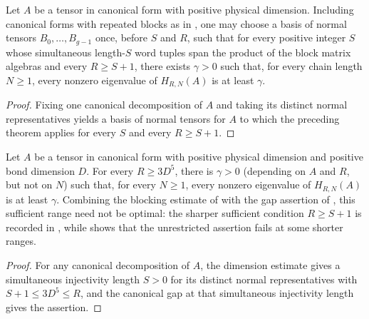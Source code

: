 \begin{lemma}
    \label{thm:canonical-gap-simultaneous-injectivity}
    \leanok
    Let $A$ be a tensor in canonical form with positive physical dimension.
    Including canonical forms with repeated blocks as in
    \cite[Section~IV.C]{Cirac2021Matrix}, one may choose a basis of normal
    tensors $B_0,\ldots,B_{g-1}$ once, before $S$ and $R$, such that for every
    positive integer $S$ whose simultaneous length-$S$ word tuples span the
    product of the block matrix algebras and every $R\geq S+1$, there exists
    $\gamma>0$ such that, for every chain length $N\geq1$, every nonzero
    eigenvalue of $H_{R,N}(A)$ is at least $\gamma$.
\end{lemma}
\begin{proof}\leanok
    Fixing one canonical decomposition of $A$ and taking its distinct normal
    representatives yields a basis of normal tensors for $A$ to which the
    preceding theorem applies for every $S$ and every $R\geq S+1$.
\end{proof}

\begin{lemma}
    \label{thm:canonical_parent_gap_bounded_range}
    \leanok
    Let $A$ be a tensor in canonical form with positive physical dimension
    and positive bond dimension $D$. For every $R\geq3D^5$, there is
    $\gamma>0$ (depending on $A$ and $R$, but not on $N$) such that, for
    every $N\geq1$, every nonzero eigenvalue of $H_{R,N}(A)$ is at least
    $\gamma$.
    Combining the blocking estimate of
    \cite[lines~317--345]{Cirac2016MPDO_arXiv} with the gap assertion of
    \cite[Section~IV.C]{Cirac2021Matrix}, this sufficient range need not be
    optimal: the sharper sufficient condition $R\geq S+1$ is recorded in
    \cite{gap:cpgsv21_block_parent_interaction_range}, while
    \cite{gap:cpgsv21_short_range_parent_gap} shows that the unrestricted
    assertion fails at some shorter ranges.
\end{lemma}
\begin{proof}
    \leanok
    For any canonical decomposition of $A$, the dimension estimate gives a
    simultaneous injectivity length $S>0$ for its distinct normal
    representatives with $S+1\leq3D^5\leq R$, and the canonical gap at that
    simultaneous injectivity length gives the assertion.
\end{proof}

